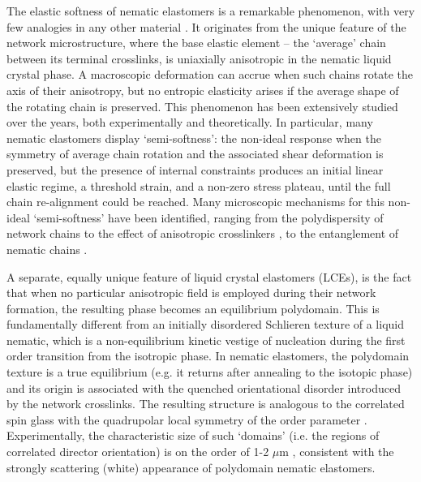 \documentclass[12pt]{article}
\begin{document}
The elastic softness of nematic elastomers is a remarkable phenomenon, with very few analogies in any other material \cite{soft1994,WTbook}. It originates from the unique feature of the network microstructure, where the base elastic element -- the `average' chain between its terminal crosslinks, is uniaxially anisotropic in the nematic liquid crystal phase. A macroscopic deformation can accrue when such chains rotate the axis of their anisotropy, but no entropic elasticity arises if the average shape of the rotating chain is preserved. This phenomenon has been extensively studied over the years, both experimentally and theoretically.   In particular, many nematic elastomers display `semi-softness': the non-ideal response when the symmetry of average chain rotation and the associated shear deformation is preserved, but the presence of internal constraints produces an initial linear elastic regime, a threshold strain, and a non-zero stress plateau, until the full chain re-alignment could be reached. Many microscopic mechanisms for this non-ideal `semi-softness' have been identified, ranging from the polydispersity of network chains \cite{Verwey1997a} to the effect of anisotropic crosslinkers \cite{Verwey1997b}, to the entanglement of nematic chains \cite{Kutter2001}.

A separate, equally unique feature of liquid crystal elastomers (LCEs), is the fact that when no particular anisotropic field is employed during their network formation, the resulting phase becomes an equilibrium polydomain. This is fundamentally different from an initially disordered Schlieren texture of a liquid nematic, which is a non-equilibrium kinetic vestige of nucleation during the first order transition from the isotropic phase. In nematic elastomers, the polydomain texture is a true equilibrium (e.g. it returns after annealing to the isotopic phase) and its origin is associated with the quenched orientational disorder introduced by the network crosslinks.  The resulting structure is analogous to the correlated spin glass with the quadrupolar local symmetry of the order parameter \cite{Fridrikh1997,zhou_2021}. Experimentally, the characteristic size of such `domains' (i.e. the regions of correlated director orientation) is on the order of 1-2 $\mu$m \cite{Clarke1998}, consistent with the strongly scattering (white) appearance of polydomain nematic elastomers. 
\end{document}
